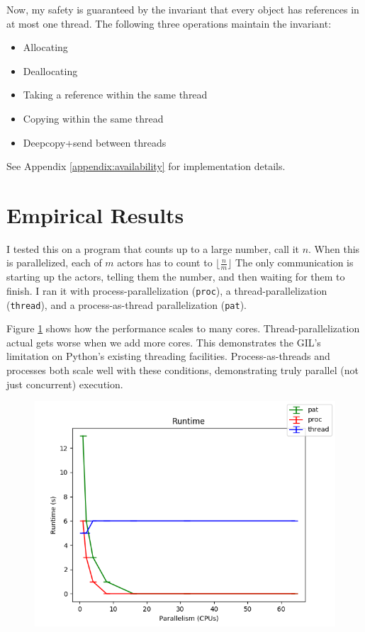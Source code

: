 \documentclass[letterpaper,twocolumn,10pt]{article}
\begin{document}
Now, my safety is guaranteed by the invariant that every object has references in at most one thread.
The following three operations maintain the invariant:
\begin{itemize}
\item Allocating
\item Deallocating
\item Taking a reference within the same thread
\item Copying within the same thread
\item Deepcopy+send between threads
\end{itemize}

See Appendix \ref{appendix:availability} for implementation details.

\section{Empirical Results}

I tested this on a program that counts up to a large number, call it \(n\).
When this is parallelized, each of \(m\) actors has to count to \(\lfloor \frac{n}{m} \rfloor\)
The only communication is starting up the actors, telling them the number, and then waiting for them to finish.
I ran it with process-parallelization (\texttt{proc}), a thread-parallelization (\texttt{thread}), and a process-as-thread parallelization (\texttt{pat}).

Figure \ref{fig:count_runtime} shows how the performance scales to many cores.
Thread-parallelization actual gets worse when we add more cores.
This demonstrates the GIL's limitation on Python's existing threading facilities.
Process-as-threads and processes both scale well with these conditions, demonstrating truly parallel (not just concurrent) execution.

\begin{figure}
\begin{center}
\includegraphics[width=\textwidth / 2]{total_runtime.png}
\end{center}
\caption{\label{fig:count_runtime} }
\end{figure}
\end{document}
